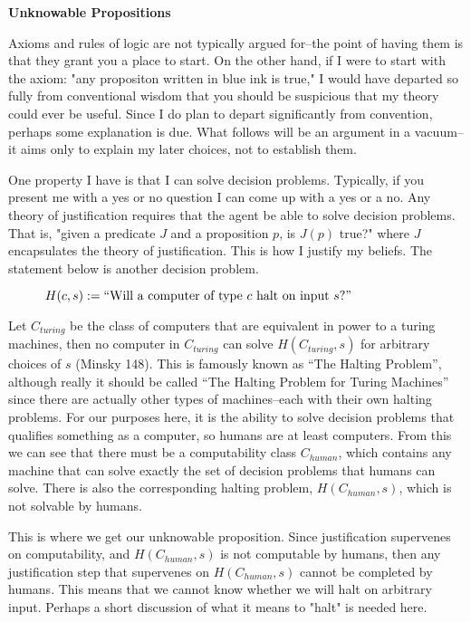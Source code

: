 \documentclass[12pt]{article}
\begin{document}
\begin{flushleft}
\setlength{\parindent}{0in}
\par\bigskip
\textbf{Unknowable Propositions}
\setlength{\parindent}{0.5in}

Axioms and rules of logic are not typically argued for--the point of having them is that they grant you a place to start.
On the other hand, if I were to start with the axiom: "any propositon written in blue ink is true," I would have departed so fully from conventional wisdom that you should be suspicious that my theory could ever be useful.
Since I do plan to depart significantly from convention, perhaps some explanation is due.
What follows will be an argument in a vacuum--it aims only to explain my later choices, not to establish them.

One property I have is that I can solve decision problems.
Typically, if you present me with a yes or no question I can come up with a yes or a no.
Any theory of justification requires that the agent be able to solve decision problems.
That is, "given a predicate $J$ and a proposition $p$, is $J(p)$ true?" where $J$ encapsulates the theory of justification.
This is how I justify my beliefs.
The statement below is another decision problem.

\par\medskip
\begin{figure}[h]
    \centering
$H(c, s) := \textnormal{``Will a computer of type } c \textnormal{ halt on input } s \textnormal{?''}$
\end{figure}

Let $C_{turing}$ be the class of computers that are equivalent in power to a turing machines, then no computer in $C_{turing}$ can solve $H(C_{turing}, s)$ for arbitrary choices of $s$ (Minsky 148).
This is famously known as ``The Halting Problem'', although really it should be called ``The Halting Problem for Turing Machines'' since there are actually other types of machines--each with their own halting problems.
For our purposes here, it is the ability to solve decision problems that qualifies something as a computer, so humans are at least computers.
From this we can see that there must be a computability class $C_{human}$, which contains any machine that can solve exactly the set of decision problems that humans can solve.
There is also the corresponding halting problem, $H(C_{human}, s)$, which is not solvable by humans.

This is where we get our unknowable proposition.
Since justification supervenes on computability, and $H(C_{human}, s)$ is not computable by humans, then any justification step that supervenes on $H(C_{human}, s)$ cannot be completed by humans.
This means that we cannot know whether we will halt on arbitrary input.
Perhaps a short discussion of what it means to "halt" is needed here.


\end{flushleft}
\end{document}
